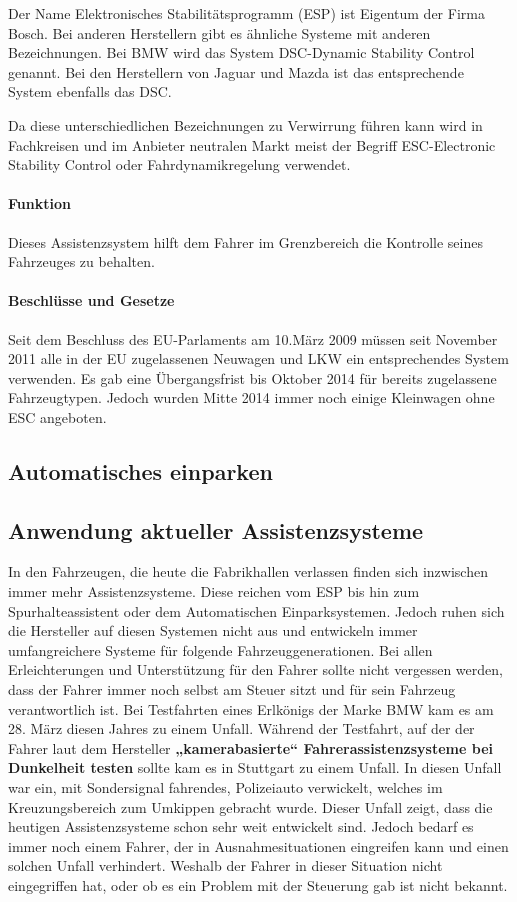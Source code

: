 Der Name Elektronisches Stabilitätsprogramm (ESP) ist Eigentum der Firma Bosch. Bei anderen Herstellern gibt es ähnliche Systeme mit anderen Bezeichnungen. Bei BMW wird das System DSC-Dynamic Stability Control genannt. Bei den Herstellern von Jaguar und Mazda ist das entsprechende System ebenfalls das DSC.

Da diese unterschiedlichen Bezeichnungen zu Verwirrung führen kann wird in Fachkreisen und im Anbieter neutralen Markt meist der Begriff ESC-Electronic Stability Control oder Fahrdynamikregelung verwendet. 
\paragraph{Funktion}Dieses Assistenzsystem hilft dem Fahrer im Grenzbereich die Kontrolle seines Fahrzeuges zu behalten. 

\paragraph{Beschlüsse und Gesetze} Seit dem Beschluss des EU-Parlaments am 10.März 2009 müssen seit November 2011 alle in der EU zugelassenen Neuwagen und LKW ein entsprechendes System verwenden. Es gab eine Übergangsfrist bis Oktober 2014 für bereits zugelassene Fahrzeugtypen. Jedoch wurden Mitte 2014 immer noch einige Kleinwagen ohne ESC angeboten. 


\subsection{Automatisches einparken}
\subsection{Anwendung aktueller Assistenzsysteme}
In den Fahrzeugen, die heute die Fabrikhallen verlassen finden sich inzwischen immer mehr Assistenzsysteme. Diese reichen vom ESP bis hin zum Spurhalteassistent oder dem Automatischen Einparksystemen. Jedoch ruhen sich die Hersteller auf diesen Systemen nicht aus und entwickeln immer umfangreichere Systeme für folgende Fahrzeuggenerationen. 
Bei allen Erleichterungen und Unterstützung für den Fahrer sollte nicht vergessen werden, dass der Fahrer immer noch selbst am Steuer sitzt und für sein Fahrzeug verantwortlich ist. Bei Testfahrten eines Erlkönigs der Marke BMW kam es am 28. März diesen Jahres zu einem Unfall. Während der Testfahrt, auf der der Fahrer laut dem Hersteller \textbf{„kamerabasierte“ Fahrerassistenzsysteme bei Dunkelheit testen} sollte kam es in Stuttgart zu einem Unfall. In diesen Unfall war ein, mit Sondersignal fahrendes, Polizeiauto verwickelt, welches im Kreuzungsbereich zum Umkippen gebracht wurde.
Dieser Unfall zeigt, dass die heutigen Assistenzsysteme schon sehr weit entwickelt sind. Jedoch bedarf es immer noch einem Fahrer, der in Ausnahmesituationen eingreifen kann und einen solchen Unfall verhindert. Weshalb der Fahrer in dieser Situation nicht eingegriffen hat, oder ob es ein Problem mit der Steuerung gab ist nicht bekannt.

